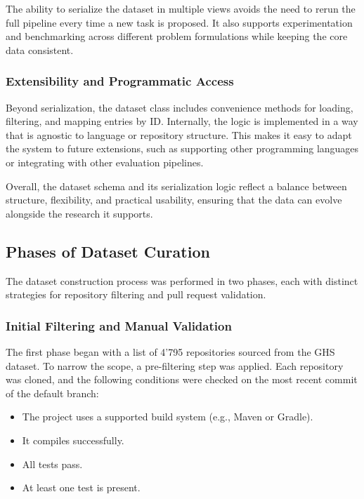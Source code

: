 The ability to serialize the dataset in multiple views avoids the need to rerun the full pipeline
every time a new task is proposed. It also supports experimentation and benchmarking across
different problem formulations while keeping the core data consistent.

\subsubsection{Extensibility and Programmatic Access}

Beyond serialization, the dataset class includes convenience methods for loading, filtering, and
mapping entries by ID. Internally, the logic is implemented in a way that is agnostic to language or
repository structure. This makes it easy to adapt the system to future extensions, such as
supporting other programming languages or integrating with other evaluation pipelines.

Overall, the dataset schema and its serialization logic reflect a balance between structure,
flexibility, and practical usability, ensuring that the data can evolve alongside the research it
supports.

\subsection{Phases of Dataset Curation}

The dataset construction process was performed in two phases, each with distinct strategies for
repository filtering and pull request validation.

\subsubsection{Initial Filtering and Manual Validation}

The first phase began with a list of 4'795 repositories sourced from the GHS dataset. To narrow the
scope, a pre-filtering step was applied. Each repository was cloned, and the following conditions
were checked on the most recent commit of the default branch:

\begin{itemize}
	\item The project uses a supported build system (e.g., Maven or Gradle).
	\item It compiles successfully.
	\item All tests pass.
	\item At least one test is present.
\end{itemize}

